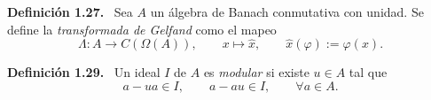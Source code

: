 \documentclass[11pt]{article}
\newenvironment{definicion}[1]
  {\par\medskip\noindent\textbf{Definición #1.}\ }
  {\par\medskip}
\begin{document}
\begin{definicion}{1.27}
Sea $A$ un álgebra de Banach conmutativa con unidad. Se define la \emph{transformada de Gelfand} como el mapeo
\[
  \Lambda:A\longrightarrow C(\Omega(A)),
  \qquad
  x\longmapsto \widehat{x},
  \qquad
  \widehat{x}(\varphi):=\varphi(x).
\]
\end{definicion}

\begin{definicion}{1.29}
Un ideal $I$ de $A$ es \emph{modular} si existe $u\in A$ tal que
\[
  a-ua\in I,
  \qquad
  a-au\in I,
  \qquad
  \forall a\in A.
\]
\end{definicion}
\end{document}
